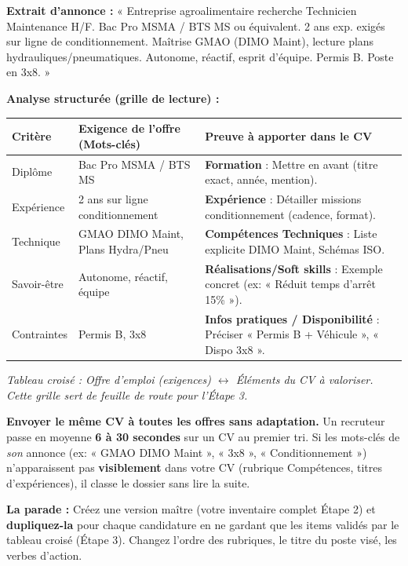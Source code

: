\documentclass[11pt]{article}
\newcommand{\cle}[1]{{\popxbold\color{popdark}#1}}
\begin{document}
\begin{exemplebox}
\textbf{Extrait d'annonce :} « Entreprise agroalimentaire recherche Technicien Maintenance H/F. Bac Pro MSMA / BTS MS ou équivalent. 2 ans exp. exigés sur ligne de conditionnement. Maîtrise GMAO (DIMO Maint), lecture plans hydrauliques/pneumatiques. Autonome, réactif, esprit d'équipe. Permis B. Poste en 3x8. »

\textbf{Analyse structurée (grille de lecture) :}
\begin{center}
\begin{tabularx}{\linewidth}{|l|X|X|}\hline
\rowcolor{popblueL}
\textbf{Critère} & \textbf{Exigence de l'offre (Mots-clés)} & \textbf{Preuve à apporter dans le CV} \\ \hline
Diplôme & Bac Pro MSMA / BTS MS & \textbf{Formation} : Mettre en avant (titre exact, année, mention). \\ \hline
Expérience & 2 ans sur ligne conditionnement & \textbf{Expérience} : Détailler missions conditionnement (cadence, format). \\ \hline
Technique & GMAO DIMO Maint, Plans Hydra/Pneu & \textbf{Compétences Techniques} : Liste explicite \cle{DIMO Maint}, \cle{Schémas ISO}. \\ \hline
Savoir-être & Autonome, réactif, équipe & \textbf{Réalisations/Soft skills} : Exemple concret (ex: « Réduit temps d'arrêt 15\% »). \\ \hline
Contraintes & Permis B, 3x8 & \textbf{Infos pratiques / Disponibilité} : Préciser « Permis B + Véhicule », « Dispo 3x8 ». \\ \hline
\end{tabularx}
\end{center}
\par\medskip\textit{Tableau croisé : Offre d'emploi (exigences) $\leftrightarrow$ Éléments du CV à valoriser. Cette grille sert de feuille de route pour l'Étape 3.}
\end{exemplebox}

\begin{attention}
\textbf{Envoyer le même CV à toutes les offres sans adaptation.}
Un recruteur passe en moyenne \textbf{6 à 30 secondes} sur un CV au premier tri. Si les mots-clés de \emph{son} annonce (ex: « GMAO DIMO Maint », « 3x8 », « Conditionnement ») n'apparaissent pas \textbf{visiblement} dans votre CV (rubrique Compétences, titres d'expériences), il classe le dossier sans lire la suite.
\par\medskip
\textbf{La parade :} Créez une \cle{version maître} (votre inventaire complet Étape 2) et \textbf{dupliquez-la} pour chaque candidature en ne gardant que les items validés par le tableau croisé (Étape 3). Changez l'ordre des rubriques, le titre du poste visé, les verbes d'action.
\end{attention}
\end{document}
